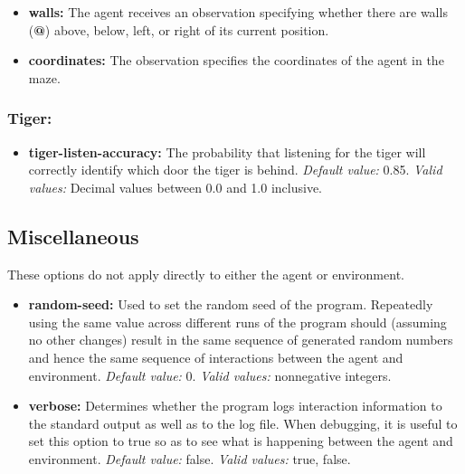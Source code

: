 \documentclass[a4paper,11pt]{article}
\begin{document}
\begin{itemize}
\begin{itemize}
  \item {\bf walls:} The agent receives an observation specifying whether there are walls ({\bf @}) above, below, left, or right of its current position.

  \item {\bf coordinates:} The observation specifies the coordinates of the agent in the maze.
  \end{itemize}
\end{itemize}



\subsubsection{Tiger:}
\begin{itemize}
\item {\bf tiger-listen-accuracy:} The probability that listening for the tiger will correctly identify which door the tiger is behind. {\em Default value:} 0.85. {\em Valid values:} Decimal values between 0.0 and 1.0 inclusive.
\end{itemize}



\subsection{Miscellaneous}
These options do not apply directly to either the agent or environment.
\begin{itemize}
\item {\bf random-seed:} Used to set the random seed of the program. Repeatedly using the same value across different runs of the program should (assuming no other changes) result in the same sequence of generated random numbers and hence the same sequence of interactions between the agent and environment. {\em Default value:} 0. {\em Valid values:} nonnegative integers.

\item {\bf verbose:} Determines whether the program logs interaction information to the standard output as well as to the log file. When debugging, it is useful to set this option to true so as to see what is happening between the agent and environment. {\em Default value:} false. {\em Valid values:} true, false.
\end{itemize}
\end{document}
